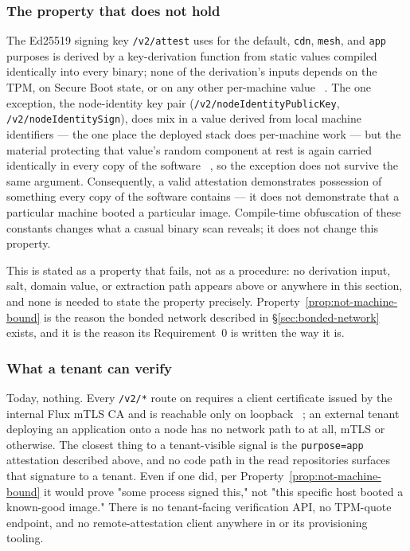 \subsubsection{The property that does not hold}

\begin{property}
\label{prop:not-machine-bound}
The Ed25519 signing key \texttt{/v2/attest} uses for the default, \texttt{cdn}, \texttt{mesh}, and
\texttt{app} purposes is derived by a key-derivation function from static values compiled
identically into every \fluxsas binary; none of the derivation's inputs depends on the TPM, on
Secure Boot state, or on any other per-machine value
\shipped~. The one exception, the
node-identity key pair (\texttt{/\allowbreak{}v2/\allowbreak{}nodeIdentityPublicKey}, \texttt{/\allowbreak{}v2/\allowbreak{}nodeIdentitySign}), does
mix in a value derived from local machine identifiers --- the one place the deployed stack does
per-machine work --- but the material protecting that value's random component at rest is again
carried identically in every copy of the software \shipped~, so
the exception does not survive the
same argument. Consequently, a valid \fluxsas
attestation demonstrates possession of something every copy of the software contains — it does
not demonstrate that a particular machine booted a particular image. Compile-time obfuscation of
these constants changes what a casual binary scan reveals; it does not change this property.
\end{property}

This is stated as a property that fails, not as a procedure: no derivation input, salt, domain
value, or extraction path appears above or anywhere in this section, and none is needed to state
the property precisely. Property~\ref{prop:not-machine-bound} is the reason the bonded network
described in \S\ref{sec:bonded-network} exists, and it is the reason its Requirement~0 is written
the way it is.

\subsubsection{What a tenant can verify}
\label{sec:tenant-verify}

Today, nothing. Every \texttt{/v2/*} route on \fluxsas requires a client certificate issued by the
internal Flux mTLS CA and is reachable only on loopback
\shipped~; an external tenant deploying an
application onto a \FluxOS node has no network path to \fluxsas at all, mTLS or otherwise. The
closest thing to a tenant-visible signal is the \texttt{purpose=app} attestation described above,
and no code path in the read repositories surfaces that signature to a tenant. Even if one did,
per Property~\ref{prop:not-machine-bound} it would prove "some \fluxsas process signed this," not
"this specific host booted a known-good image." There is no tenant-facing verification API, no
TPM-quote endpoint, and no remote-attestation client anywhere in \fluxsas or its provisioning
tooling.

